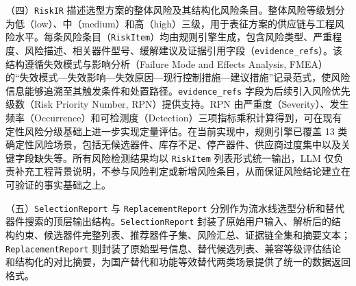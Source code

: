（四）\texttt{RiskIR} 描述选型方案的整体风险及其结构化风险条目。整体风险等级划分为低（low）、中（medium）和高（high）三级，用于表征方案的供应链与工程风险水平。每条风险条目（\texttt{RiskItem}）均由规则引擎生成，包含风险类型、严重程度、风险描述、相关器件型号、缓解建议及证据引用字段（\texttt{evidence\_refs}）。该结构遵循失效模式与影响分析（Failure Mode and Effects Analysis, FMEA）的“失效模式—失效影响—失效原因—现行控制措施—建议措施”记录范式，使风险信息能够追溯至其触发条件和处置路径。\texttt{evidence\_refs} 字段为后续引入风险优先级数（Risk Priority Number, RPN）提供支持。RPN 由严重度（Severity）、发生频率（Occurrence）和可检测度（Detection）三项指标乘积计算得到，可在现有定性风险分级基础上进一步实现定量评估。在当前实现中，规则引擎已覆盖 13 类确定性风险场景，包括无候选器件、库存不足、停产器件、供应商过度集中以及关键字段缺失等。所有风险检测结果均以 \texttt{RiskItem} 列表形式统一输出，LLM 仅负责补充工程背景说明，不参与风险判定或新增风险条目，从而保证风险结论建立在可验证的事实基础之上。


（五）\texttt{SelectionReport} 与 \texttt{ReplacementReport} 分别作为流水线选型分析和替代器件搜索的顶层输出结构。\texttt{SelectionReport} 封装了原始用户输入、解析后的结构约束、候选器件完整列表、推荐器件子集、风险汇总、证据链全集和摘要文本；\texttt{ReplacementReport} 则封装了原始型号信息、替代候选列表、兼容等级评估结论和结构化的对比摘要，为国产替代和功能等效替代两类场景提供了统一的数据返回格式。
